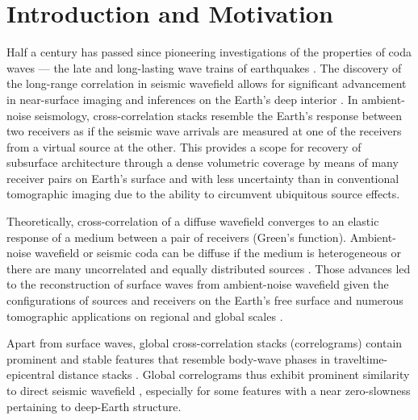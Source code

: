 \section{Introduction and Motivation}\label{sec:theo_intro}

Half a century has passed since pioneering investigations of the properties of coda waves --- the late and long-lasting wave trains of earthquakes \citep{aki1969analysis,aki_origin_1975}. The discovery of the long-range correlation in seismic wavefield allows for significant advancement in near-surface imaging  \citep{campillo_long-range_2003,shapiro_high-resolution_2005} and inferences on the Earth's deep interior \citep{poli_body-wave_2012,poli_imaging_2015,tkalcic_shear_2018}. In ambient-noise seismology, cross-correlation stacks resemble the Earth's response between two receivers as if the seismic wave arrivals are measured at one of the receivers from a virtual source at the other. This provides a scope for recovery of subsurface architecture through a dense volumetric coverage by means of many receiver pairs on Earth's surface and with less uncertainty than in conventional tomographic imaging due to the ability to circumvent ubiquitous source effects.



Theoretically, cross-correlation of a diffuse wavefield converges to an elastic response of a medium between a pair of receivers (Green's function). Ambient-noise wavefield or seismic coda can be diffuse if the medium is heterogeneous  \citep{lobkis_emergence_2001} or there are many uncorrelated and equally distributed sources \citep{wapenaar_retrieving_2004,wapenaar_tutorial_2010}. Those advances led to the reconstruction of surface waves from ambient-noise wavefield given the configurations of sources and receivers on the Earth's free surface \citep{shapiro_high-resolution_2005} and numerous tomographic applications on regional and global scales \citep[e.g,][]{yao_surface-wave_2006,moschetti_surface_2007,bensen_broadband_2008,lin_surface_2008}.



Apart from surface waves, global cross-correlation stacks (correlograms) contain prominent and stable features that resemble body-wave phases in traveltime-epicentral distance stacks \citep{ruigrok_global-scale_2008,boue_teleseismic_2013,lin_seismic_2013,lin_extracting_2013,nishida_global_2013,poli_imaging_2015,wang_equatorial_2015,poli_analysis_2017,pham_earths_2018}. Global correlograms thus exhibit prominent similarity to direct seismic wavefield \citep[e.g.,][]{boue_reverberations_2014,wang_equatorial_2015,poli_analysis_2017,pham_earths_2018}, especially for some features with a near zero-slowness pertaining to deep-Earth structure.




